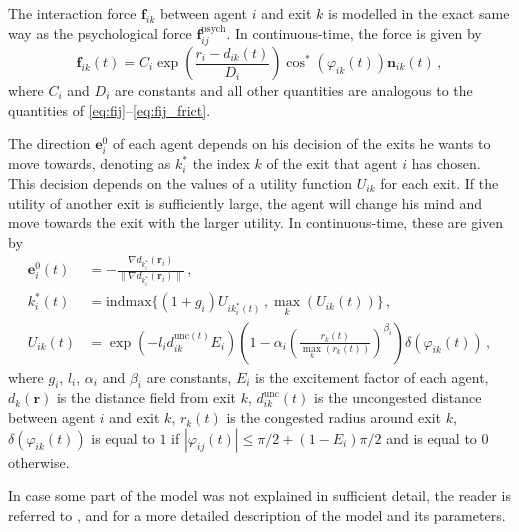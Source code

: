 The interaction force $\bm{f}_{ik}$ between agent $i$ and exit $k$ is modelled in the exact same way as the psychological force $\bm{f}_{ij}^{\mathrm{psych}}$. In continuous-time, the force is given by
\begin{equation} \label{eq:fik}
	\bm{f}_{ik}(t) = C_i \exp\left(\frac{r_{i}-d_{ik}(t)}{D_i}\right) \cos^*(\varphi_{ik}(t)) \bm{n}_{ik}(t) \,,
\end{equation}
where $C_i$ and $D_i$ are constants and all other quantities are analogous to the quantities of \eqref{eq:fij}--\eqref{eq:fij_frict}.

The direction $\bm{e}_i^0$ of each agent depends on his decision of the exits he wants to move towards, denoting as $k_i^*$ the index $k$ of the exit that agent $i$ has chosen. This decision depends on the values of a utility function $U_{ik}$ for each exit. If the utility of another exit is sufficiently large, the agent will change his mind and move towards the exit with the larger utility. In continuous-time, these are given by
\begin{subequations}
\begin{align}
	\bm{e}_i^0(t) & = - \frac{\nabla d_{k_i^*}(\bm{r}_i)}{\lVert \nabla d_{k_i^*}(\bm{r}_i) \rVert}  \,, \label{eq:ei} \\
	k_i^*(t) & = \mathrm{indmax}\{ (1+g_i) U_{ik_i^*(t)} \,, \max_k\left(U_{ik}(t)\right) \} \,, \label{eq:ki} \\
	U_{ik}(t) & = \exp\left( -l_i d_{ik}^{\mathrm{unc}(t)} E_i \right) \left(1-\alpha_i\left(\frac{r_k(t)}{\max_k\left(r_k(t)\right)}\right)^{\beta_i}\right) \delta(\varphi_{ik}(t)) \,, \label{eq:Uik}
\end{align}
\end{subequations}
where $g_i$, $l_i$, $\alpha_i$ and $\beta_i$ are constants, $E_i$ is the excitement factor of each agent, $d_k(\bm{r})$ is the distance field from exit $k$, $d_{ik}^{\mathrm{unc}}(t)$ is the uncongested distance between agent $i$ and exit $k$, $r_k(t)$ is the congested radius around exit $k$, $\delta(\varphi_{ik}(t))$ is equal to $1$ if $|\varphi_{ij}(t)| \leq \pi/2 + (1-E_i)\pi/2$ and is equal to $0$ otherwise.

In case some part of the model was not explained in sufficient detail, the reader is referred to \cite{Helbing2000}, \cite{Zainuddin2010} and \cite{Wang2016} for a more detailed description of the model and its parameters.

